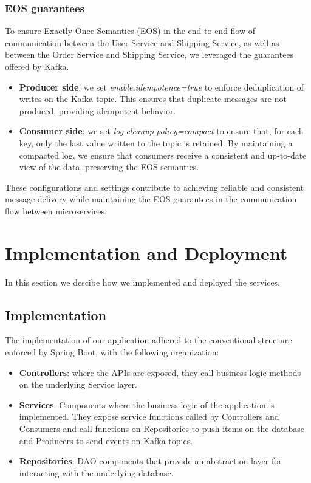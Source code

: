 \documentclass[11pt]{article}
\begin{document}
\subsubsection{EOS guarantees}
To ensure Exactly Once Semantics (EOS) in the end-to-end flow of communication between the User Service and Shipping Service, as well as between the Order Service and Shipping Service, we leveraged the guarantees offered by Kafka.
\begin{itemize}
    \item \textbf{Producer side}: we set \textit{enable.idempotence=true} to enforce deduplication of writes on the Kafka topic. This \href{https://developer.confluent.io/patterns/event-processing/idempotent-writer/}{ensures} that duplicate messages are not produced, providing idempotent behavior.
    \item \textbf{Consumer side}: we set \textit{log.cleanup.policy=compact} to \href{https://docs.confluent.io/kafka/design/log_compaction.html#compaction-guarantees}{ensure} that, for each key, only the last value written to the topic is retained. By maintaining a compacted log, we ensure that consumers receive a consistent and up-to-date view of the data, preserving the EOS semantics.
\end{itemize}
These configurations and settings contribute to achieving reliable and consistent message delivery while maintaining the EOS guarantees in the communication flow between microservices.


\section{Implementation and Deployment}
In this section we descibe how we implemented and deployed the services.

\subsection{Implementation}
The implementation of our application adhered to the conventional structure enforced by Spring Boot, with the following organization:

\begin{itemize}
    \item \textbf{Controllers}: where the APIs are exposed, they call business logic methods on the underlying Service layer.
    \item \textbf{Services}: Components where the business logic of the application is implemented. They expose service functions called by Controllers and Consumers and call functions on Repositories to push items on the database and Producers to send events on Kafka topics.
    \item \textbf{Repositories}: DAO components that provide an abstraction layer for interacting with the underlying database.
\end{itemize}
\end{document}
